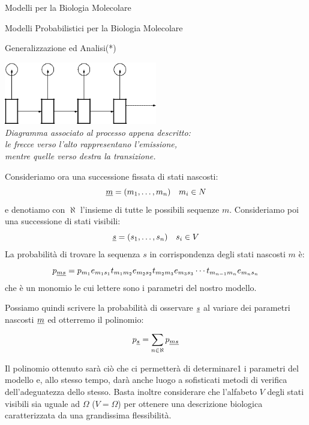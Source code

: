\documentclass{article}
\begin{document}
\begin{section}{Modelli per la Biologia Molecolare}
\begin{subsection}{Modelli Probabilistici per la Biologia Molecolare}
\begin{subsubsection}{Generalizzazione ed Analisi(*)}
				\begin{center}
					\vspace{15pt}
					\includegraphics[width=0.5\textwidth]{Pics/markov.png}
					\\ \vspace{6pt}
					\emph{Diagramma associato al processo appena descritto: \\ le frecce verso l’alto rappresentano l’emissione, \\ mentre quelle verso destra la transizione.}
					\vspace{12pt}
				\end{center}
				Consideriamo ora una successione fissata di stati nascosti: $$ \underline{m} = (m_1, \ldots, m_n) \quad m_i\in N $$ e denotiamo con $\aleph$ l’insieme di tutte le possibili sequenze $m$. Consideriamo poi una successione di stati visibili: $$ \underline{s} = (s_1, \ldots, s_n) \quad s_i \in V $$
				La probabilità di trovare la sequenza $s$ in corrispondenza degli stati nascosti $m$ è: $$ p_{\underline{ms}} = p_{m_1}e_{m_1s_1}t_{m_1m_2}e_{m_2s_2}t_{m_2m_3}e_{m_3s_3}\cdots t_{m_{n-1}m_n}e_{m_ns_n} $$ che è un monomio le cui lettere sono i parametri del nostro modello. 
				
				Possiamo quindi scrivere la probabilità di osservare $\underline{s}$ al variare dei parametri nascosti $\underline{m}$ ed otterremo il polinomio: $$ p_{\underline{s}} = \sum_{n\in\aleph}^{}p_{\underline{ms}} $$ 
				
				Il polinomio ottenuto sarà ciò che ci permetterà di determinare1 i parametri del modello e, allo stesso tempo, darà anche luogo a sofisticati metodi di verifica dell’adeguatezza dello stesso. Basta inoltre considerare che l’alfabeto $V$ degli stati visibili sia uguale ad $\Omega$ ($V=\Omega$) per ottenere una descrizione biologica caratterizzata da una grandissima flessibilità.
			\end{subsubsection}
			
		\end{subsection}

	\end{section}
	\newpage
\end{document}
